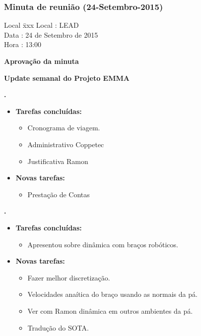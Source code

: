 \subsubsection{Minuta de reunião (24-Setembro-2015)}

\begin{tabbing}
  Local \= xxx \kill
  Local \> : LEAD \\
  Data  \> : 24 de Setembro de 2015 \\
  Hora  \> : 13:00
\end{tabbing}


\textbf{Aprovação da minuta}

\textbf{Update semanal do Projeto EMMA}
   							
\textbf{\alana.} 
	\begin{itemize}
		\item \textbf{Tarefas concluídas:}
			\begin{itemize}    
				\item Cronograma de viagem.
				\item Administrativo Coppetec
				\item Justificativa Ramon
				 
			\end{itemize}
		
		\item \textbf{Novas tarefas:}
			\begin{itemize} 
				\item Prestação de Contas
			\end{itemize}
	\end{itemize}   		

	  \textbf{\renan.} 
	\begin{itemize}
		\item \textbf{Tarefas concluídas:}
			\begin{itemize}    
				\item Apresentou sobre dinâmica com braços robóticos.
			\end{itemize}
		
		\item \textbf{Novas tarefas:}
			\begin{itemize} 
			    \item Fazer melhor discretização.
			    \item Velocidades anaítica do braço usando as normais da pá.
			    \item Ver com Ramon dinâmica em outros ambientes da pá.
			    \item Tradução do SOTA.
			\end{itemize}
	\end{itemize}	
	
